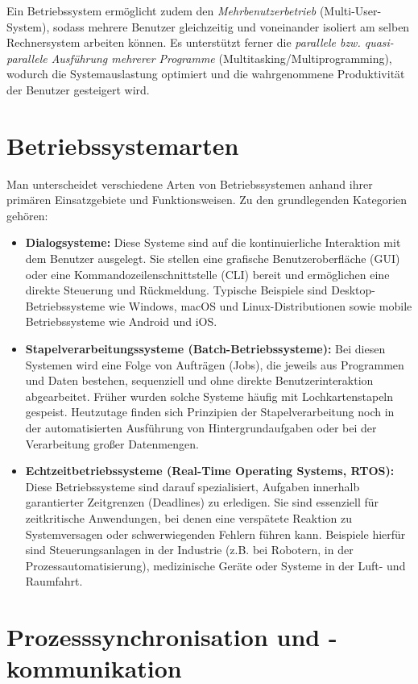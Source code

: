 Ein Betriebssystem ermöglicht zudem den \textit{Mehrbenutzerbetrieb} (Multi-User-System), sodass mehrere Benutzer gleichzeitig und voneinander isoliert am selben Rechnersystem arbeiten können. Es unterstützt ferner die \textit{parallele bzw. quasi-parallele Ausführung mehrerer Programme} (Multitasking/Multiprogramming), wodurch die Systemauslastung optimiert und die wahrgenommene Produktivität der Benutzer gesteigert wird.

\section{Betriebssystemarten}

Man unterscheidet verschiedene Arten von Betriebssystemen anhand ihrer primären Einsatzgebiete und Funktionsweisen. Zu den grundlegenden Kategorien gehören:

\begin{itemize}
\item \textbf{Dialogsysteme:} Diese Systeme sind auf die kontinuierliche Interaktion mit dem Benutzer ausgelegt. Sie stellen eine grafische Benutzeroberfläche (GUI) oder eine Kommandozeilenschnittstelle (CLI) bereit und ermöglichen eine direkte Steuerung und Rückmeldung. Typische Beispiele sind Desktop-Betriebssysteme wie Windows, macOS und Linux-Distributionen sowie mobile Betriebssysteme wie Android und iOS.
\item \textbf{Stapelverarbeitungssysteme (Batch-Betriebssysteme):} Bei diesen Systemen wird eine Folge von Aufträgen (Jobs), die jeweils aus Programmen und Daten bestehen, sequenziell und ohne direkte Benutzerinteraktion abgearbeitet. Früher wurden solche Systeme häufig mit Lochkartenstapeln gespeist. Heutzutage finden sich Prinzipien der Stapelverarbeitung noch in der automatisierten Ausführung von Hintergrundaufgaben oder bei der Verarbeitung großer Datenmengen.
\item \textbf{Echtzeitbetriebssysteme (Real-Time Operating Systems, RTOS):} Diese Betriebssysteme sind darauf spezialisiert, Aufgaben innerhalb garantierter Zeitgrenzen (Deadlines) zu erledigen. Sie sind essenziell für zeitkritische Anwendungen, bei denen eine verspätete Reaktion zu Systemversagen oder schwerwiegenden Fehlern führen kann. Beispiele hierfür sind Steuerungsanlagen in der Industrie (z.B. bei Robotern, in der Prozessautomatisierung), medizinische Geräte oder Systeme in der Luft- und Raumfahrt.
\end{itemize}

\section{Prozesssynchronisation und -kommunikation}

